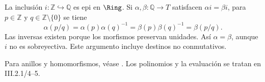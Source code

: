 \begin{ejem}
La inclusión $i:\mathbb Z\hookrightarrow\mathbb Q$ es epi en $\Ring$. Si $\alpha,\beta:\mathbb Q\to T$ satisfacen $\alpha i=\beta i$, para $p\in\mathbb Z$ y $q\in\mathbb Z\setminus\{0\}$ se tiene
\[
\alpha(p/q)=\alpha(p)\alpha(q)^{-1}
=\beta(p)\beta(q)^{-1}=\beta(p/q).
\]
Las inversas existen porque los morfismos preservan unidades. Así $\alpha=\beta$, aunque $i$ no es sobreyectiva. Este argumento incluye destinos no conmutativos.
\end{ejem}

\begin{obs}
Para anillos y homomorfismos, véase \citet[cap.~III, 1.1/2/5/8--15/19 y 2.1--3]{aluffi2009}. Los polinomios y la evaluación se tratan en III.2.1/4--5.
\end{obs}
